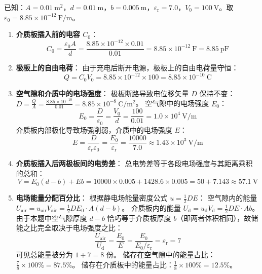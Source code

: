\begin{solution}
已知：$A = 0.01 \ \mathrm{m^2}$，$d = 0.01 \ \mathrm{m}$，$b = 0.005 \ \mathrm{m}$，$\varepsilon_{\mathrm{r}} = 7.0$，$V_0 = 100 \ \mathrm{V}$。取 $\varepsilon_0 = 8.85 \times 10^{-12} \ \mathrm{F/m}$。

\begin{enumerate}
  \item[(a)] \textbf{介质板插入前的电容 $C_0$}：
  $$ C_0 = \frac{\varepsilon_0 A}{d} = \frac{8.85 \times 10^{-12} \times 0.01}{0.01} = 8.85 \times 10^{-12} \ \mathrm{F} = 8.85 \ \mathrm{pF} $$

  \item[(b)] \textbf{极板上的自由电荷}：
  由于充电后断开电源，极板上的自由电荷量守恒：
  $$ Q = C_0 V_0 = 8.85 \times 10^{-12} \times 100 = 8.85 \times 10^{-10} \ \mathrm{C} $$

  \item[(c)] \textbf{空气隙和介质中的电场强度}：
  极板断路导致电位移矢量 $D$ 保持不变：$D = \frac{Q}{A} = \frac{8.85 \times 10^{-10}}{0.01} = 8.85 \times 10^{-8} \ \mathrm{C/m^2}$。
  空气隙中的电场强度 $E_0$：
  $$ E_0 = \frac{D}{\varepsilon_0} = \frac{V_0}{d} = \frac{100}{0.01} = 1.0 \times 10^4 \ \mathrm{V/m} $$
  介质板内部极化导致场强削弱，介质中的电场强度 $E$：
  $$ E = \frac{D}{\varepsilon_{\mathrm{r}} \varepsilon_0} = \frac{E_0}{\varepsilon_{\mathrm{r}}} = \frac{10000}{7.0} \approx 1.43 \times 10^3 \ \mathrm{V/m} $$

  \item[(d)] \textbf{介质板插入后两极板间的电势差}：
  总电势差等于各段电场强度与其距离乘积的总和：
  $$ V = E_0 (d - b) + E b = 10000 \times 0.005 + 1428.6 \times 0.005 = 50 + 7.143 \approx 57.1 \ \mathrm{V} $$

  \item[(e)] \textbf{电场能量分配百分比}：
  根据静电场能量密度公式 $u = \frac{1}{2} D E$：
  空气隙内的能量 $U_{\mathrm{air}} = u_{\mathrm{air}} V_{\mathrm{air}} = \frac{1}{2} D E_0 \cdot A(d - b)$。
  介质板内的能量 $U_{\mathrm{d}} = u_{\mathrm{d}} V_{\mathrm{d}} = \frac{1}{2} D E \cdot Ab$。
  由于本题中空气隙厚度 $d-b$ 恰巧等于介质板厚度 $b$（即两者体积相同），故储能之比完全取决于电场强度之比：
  $$ \frac{U_{\mathrm{air}}}{U_{\mathrm{d}}} = \frac{E_0}{E} = \frac{E_0}{E_0 / \varepsilon_{\mathrm{r}}} = \varepsilon_{\mathrm{r}} = 7 $$
  可见总能量被分为 $1+7 = 8$ 份。
  储存在空气隙中的能量占比：$\frac{7}{8} \times 100\% = 87.5\%$。
  储存在介质板中的能量占比：$\frac{1}{8} \times 100\% = 12.5\%$。
\end{enumerate}
\end{solution}

